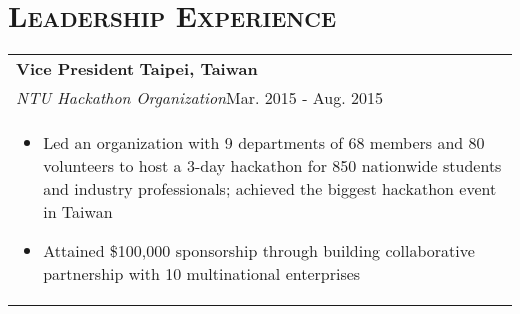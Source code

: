 \documentclass[letterpaper,11pt]{article} %
\begin{document}
{\begin{tabular}{p{18.5cm}}
%
\end{tabular}

\section{\Large\bf\textsc{Leadership Experience}}
\begin{tabular}{p{18.5cm}}
{\bf{Vice President}} \hfill \bf{Taipei, Taiwan}\\
{\it NTU Hackathon Organization}\hfill Mar. 2015 - Aug. 2015\\ %
\begin{itemize}
\vspace{-2mm}
\item Led an organization with 9 departments of 68 members and 80 volunteers to host a 3-day hackathon for 850 nationwide students and industry professionals; achieved the biggest hackathon event in Taiwan
\item Attained \$100,000 sponsorship through building collaborative partnership with 10 multinational enterprises\vspace*{-\baselineskip}
\end{itemize}\\
\end{tabular}
%
%

}
\end{document}
